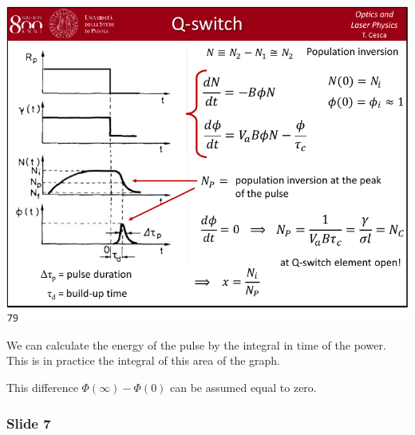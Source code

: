 \documentclass[../main/main.tex]{subfiles}
\begin{document}
\begin{minipage}[]{0.5\linewidth}
\centering
\includegraphics[page=6,width=1\textwidth]{../lessons/pdf_file/15_lecture.pdf}
\end{minipage}
\hspace{0.3cm}\vspace{0.3cm}
\begin{minipage}[c]{0.47\linewidth}

We can calculate the energy of the pulse by the integral in time of the power.
This is in practice the integral of this area of the graph.

This difference \( \Phi (\infty ) - \Phi (0) \) can be assumed equal to zero.

\end{minipage}


\subsubsection*{Slide 7}
\end{document}
